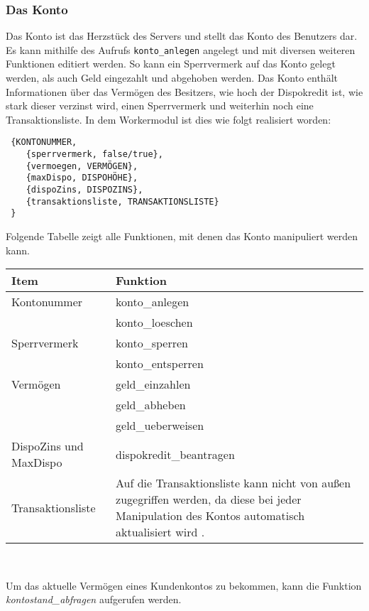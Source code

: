 \subsubsection{Das Konto}
Das Konto ist das Herzstück des Servers und stellt das Konto des Benutzers dar. Es kann mithilfe des Aufrufs \texttt{konto\_anlegen} angelegt und mit diversen weiteren Funktionen editiert werden. So kann ein Sperrvermerk auf das Konto gelegt werden, als auch Geld eingezahlt und abgehoben werden. Das Konto enthält Informationen über das Vermögen des Besitzers, wie hoch der Dispokredit ist, wie stark dieser verzinst wird, einen Sperrvermerk und weiterhin noch eine Transaktionsliste. In dem Workermodul ist dies wie folgt realisiert worden:
\begin{lstlisting}
 {KONTONUMMER, 
	{sperrvermerk, false/true},
 	{vermoegen, VERMÖGEN},
	{maxDispo, DISPOHÖHE},
	{dispoZins, DISPOZINS},
	{transaktionsliste, TRANSAKTIONSLISTE}
 }
\end{lstlisting}
Folgende Tabelle zeigt alle Funktionen, mit denen das Konto manipuliert werden kann.\\
\begin{center}
\begin{tabular}{p{5 cm}|p{9 cm}}
Item & Funktion \\
				\hline\hline
Kontonummer & konto\_anlegen \\
& konto\_loeschen \\
				\hline
Sperrvermerk & konto\_sperren \\
& konto\_entsperren \\
				\hline
Vermögen & geld\_einzahlen \\
& geld\_abheben \\
& geld\_ueberweisen\\
				\hline
DispoZins und MaxDispo & dispokredit\_beantragen \\
				\hline
Transaktionsliste & Auf die Transaktionsliste kann nicht von außen zugegriffen werden, da diese bei jeder Manipulation des Kontos automatisch aktualisiert wird .
\end{tabular}\\
\end{center}
Um das aktuelle Vermögen eines Kundenkontos zu bekommen, kann die Funktion \textit{kontostand\_abfragen} aufgerufen werden. 
